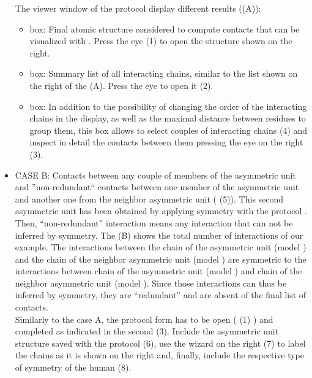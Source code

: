 \begin{itemize}
The viewer window of the protocol \chimera {} display different results ((A)):
    \begin{itemize}
    \item {} box: Final atomic structure considered to compute contacts that can be visualized with \chimera. Press the eye (1) to open the structure shown on the right.
    \item {} box: Summary list of all interacting chains, similar to the list shown on the right of the  (A). Press the eye to open it (2).
    \item {} box: In addition to the possibility of changing the order of the interacting chains in the display, as well as the maximal distance between residues to group them, this box allows to select couples of interacting chains (4) and inspect in detail the contacts between them pressing the eye on the right (3).
    \end{itemize}
 
 
 
\item CASE B: Contacts between any couple of members of the asymmetric unit and ''non-redundant`` contacts between one member of the asymmetric unit and another one from the neighbor asymmetric unit ( (5)). This second asymmetric unit has been obtained by applying symmetry with the protocol . Then, ``non-redundant'' interaction means any interaction that can not be inferred by symmetry. The   (B) shows the total number of interactions of our example. The interactions between the chain  of the asymmetric unit (model ) and the chain  of the neighbor asymmetric unit (model ) are symmetric to the interactions between chain  of the asymmetric unit (model ) and chain  of the neighbor asymmetric unit (model ). Since those interactions can thus be inferred by symmetry, they are ``redundant'' and are absent of the final list of contacts.\\  
       
Similarly to the case A, the protocol form has to be open ( (1) ) and completed as indicated in the second  (3). Include the asymmetric unit structure saved with the protocol \chimera {} (6), use the wizard on the right (7) to label the chains as it is shown on the right and, finally, include the respective type of symmetry of the human  (8).\\ 
        

\end{itemize}
